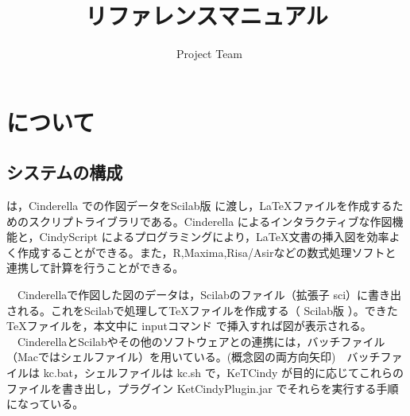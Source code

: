 \documentclass[papersize,a4paper,12pt,uplatex]{jsarticle}
\begin{document}
\title{\ketcindy リファレンスマニュアル}
\author{\ketcindy\ Project Team}
\maketitle

\tableofcontents

\newpage


\section{\ketcindy について}
\subsection{システムの構成}
\ketcindy は，Cinderella での作図データをScilab版 \ketpic に渡し，\LaTeX ファイルを作成するためのスクリプトライブラリである。Cinderella によるインタラクティブな作図機能と，CindyScript によるプログラミングにより，\LaTeX 文書の挿入図を効率よく作成することができる。また，R,Maxima,Risa/Asirなどの数式処理ソフトと連携して計算を行うことができる。



　Cinderellaで作図した図のデータは，Scilabのファイル（拡張子 sci）に書き出される。これをScilabで処理して\TeX ファイルを作成する（ Scilab版 \ketpic）。できた\TeX ファイルを，本文中に inputコマンド で挿入すれば図が表示される。\\
　CinderellaとScilabやその他のソフトウェアとの連携には，バッチファイル（Macではシェルファイル）を用いている。(概念図の両方向矢印)　バッチファイルは kc.bat，シェルファイルは kc.sh で，KeTCindy が目的に応じてこれらのファイルを書き出し，プラグイン KetCindyPlugin.jar でそれらを実行する手順になっている。\\
　\\
\end{document}
